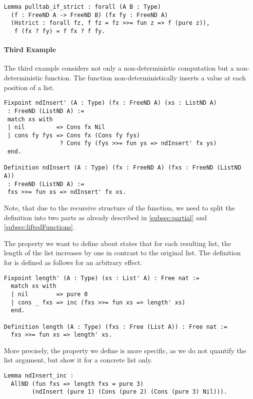 \begin{verbatim}
Lemma pulltab_if_strict : forall (A B : Type)
  (f : FreeND A -> FreeND B) (fx fy : FreeND A)
  (Hstrict : forall fz, f fz = fz >>= fun z => f (pure z)),
   f (fx ? fy) = f fx ? f fy.
\end{verbatim}

\paragraph{Third Example}
The third example considers not only a non-deterministic computation but a non-deterministic function.
The function  non-deterministically inserts a value at each position of a list.

\begin{verbatim}
Fixpoint ndInsert' (A : Type) (fx : FreeND A) (xs : ListND A)
 : FreeND (ListND A) :=
 match xs with
 | nil         => Cons fx Nil
 | cons fy fys => Cons fx (Cons fy fys)
                ? Cons fy (fys >>= fun ys => ndInsert' fx ys)
 end.

Definition ndInsert (A : Type) (fx : FreeND A) (fxs : FreeND (ListND A))
 : FreeND (ListND A) :=
 fxs >>= fun xs => ndInsert' fx xs.
\end{verbatim}

Note, that due to the recursive structure of the function, we need to split the definition into two parts as already described in \autoref{subsec:partial} and \autoref{subsec:liftedFunctions}.

The property we want to define about  states that for each resulting list, the length of the list increases by one in contrast to the original list.
The definition for  is defined as follows for an arbitrary effect.

\begin{verbatim}
Fixpoint length' (A : Type) (xs : List' A) : Free nat :=
  match xs with
  | nil        => pure 0
  | cons _ fxs => inc (fxs >>= fun xs => length' xs)
  end.

Definition length (A : Type) (fxs : Free (List A)) : Free nat :=
  fxs >>= fun xs => length' xs.
\end{verbatim}
  
More precisely, the property we define is more specific, as we do not quantify the list argument, but show it for a concrete list only.

\begin{verbatim}
Lemma ndInsert_inc :
  AllND (fun fxs => length fxs = pure 3)
        (ndInsert (pure 1) (Cons (pure 2) (Cons (pure 3) Nil))).
\end{verbatim}

